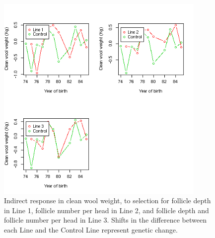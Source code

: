 %

\begin{figure}[!htp]
  \centering
   \includegraphics[width=0.9\textwidth]{dgcww.png}
  \caption{Indirect response in clean wool weight, to selection for follicle depth in Line 1, follicle number per head in Line 2, and follicle depth and follicle number per head in Line 3. Shifts in the difference between  each Line and the  Control Line represent genetic change.}
  \label{fig:dgcww}
\end{figure}

%


